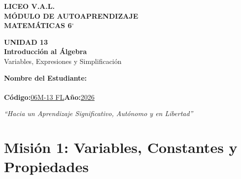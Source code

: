 \documentclass[12pt, letterpaper]{article}
\begin{document}

\begin{center}
	{\Huge\textbf{LICEO V.A.L.}}\\[0.5cm]
	{\LARGE\textbf{MÓDULO DE AUTOAPRENDIZAJE}}\\[0.5cm]
	{\Large\textbf{MATEMÁTICAS 6$^\circ$}}\\[0.5cm]
	\begin{tcolorbox}[colback=valblue!10, colframe=valblue, arc=3mm, boxrule=1.5pt]
		\centering\Huge\textbf{UNIDAD 13}\\[0.2cm]
		\Large\textbf{Introducción al Álgebra}\\[0.2cm]
		\large Variables, Expresiones y Simplificación
	\end{tcolorbox}
	\vspace{0.6cm}
	\begin{tcolorbox}[colback=white, colframe=valblue, width=12cm, arc=3mm, boxrule=1.5pt]
		\centering\vspace{0.3cm}
		\textbf{Nombre del Estudiante:}\\[0.3cm]
		\underline{\hspace{9cm}}\\[0.5cm]
		\textbf{Código:}\;\underline{06M-13 FL}\hspace{1cm}\textbf{Año:}\;\underline{2026}
		\vspace{0.3cm}
	\end{tcolorbox}
	\vspace{0.8cm}
	\textit{``Hacia un Aprendizaje Significativo, Autónomo y en Libertad''}
\end{center}


\section*{Misión 1: Variables, Constantes y Propiedades}
\end{document}
